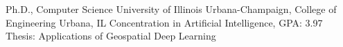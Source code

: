 
        {Ph.D., Computer Science}
        {University of Illinois Urbana-Champaign, College of Engineering}
        {Urbana, IL}
        {Concentration in Artificial Intelligence, GPA: 3.97}
        {Thesis: Applications of Geospatial Deep Learning}